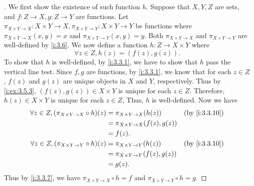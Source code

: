 \begin{proof}[]
  We first show the existence of such function \(h\).
  Suppose that \(X, Y, Z\) are sets, and \(f : Z \to X, g : Z \to Y\) are functions.
  Let \(\pi_{X \times Y \to X} : X \times Y \to X, \pi_{X \times Y \to Y} : X \times Y \to Y\) be functions where \(\pi_{X \times Y \to X}(x, y) = x\) and \(\pi_{X \times Y \to Y}(x, y) = y\).
  Both \(\pi_{X \times Y \to X}\) and \(\pi_{X \times Y \to Y}\) are well-defined by \cref{i:3.6}.
  We now define a function \(h : Z \to X \times Y\) where
  \[
    \forall z \in Z, h(z) = (f(z), g(z)).
  \]
  To show that \(h\) is well-defined, by \cref{i:3.3.1}, we have to show that \(h\) pass the vertical line test.
  Since \(f, g\) are functions, by \cref{i:3.3.1}, we know that for each \(z \in Z\), \(f(z)\) and \(g(z)\) are unique objects in \(X\) and \(Y\), respectively.
  Thus by \cref{i:ex:3.5.3}, \((f(z), g(z)) \in X \times Y\) is unique for each \(z \in Z\).
  Therefore, \(h(z) \in X \times Y\) is unique for each \(z \in Z\),
  Thus, \(h\) is well-defined.
  Now we have
  \begin{align*}
    \forall z \in Z, (\pi_{X \times Y \to X} \circ h)(z) & = \pi_{X \times Y \to X}(h(z))       &  & \by{i:3.3.10} \\
                                                         & = \pi_{X \times Y \to X}(f(z), g(z))                    \\
                                                         & = f(z).                                                 \\
    \forall z \in Z, (\pi_{X \times Y \to Y} \circ h)(z) & = \pi_{X \times Y \to Y}(h(z))       &  & \by{i:3.3.10} \\
                                                         & = \pi_{X \times Y \to Y}(f(z), g(z))                    \\
                                                         & = g(z).
  \end{align*}
  Thus by \cref{i:3.3.7}, we have \(\pi_{X \times Y \to X} \circ h = f\) and \(\pi_{X \times Y \to Y} \circ h = g\).


\end{proof}
